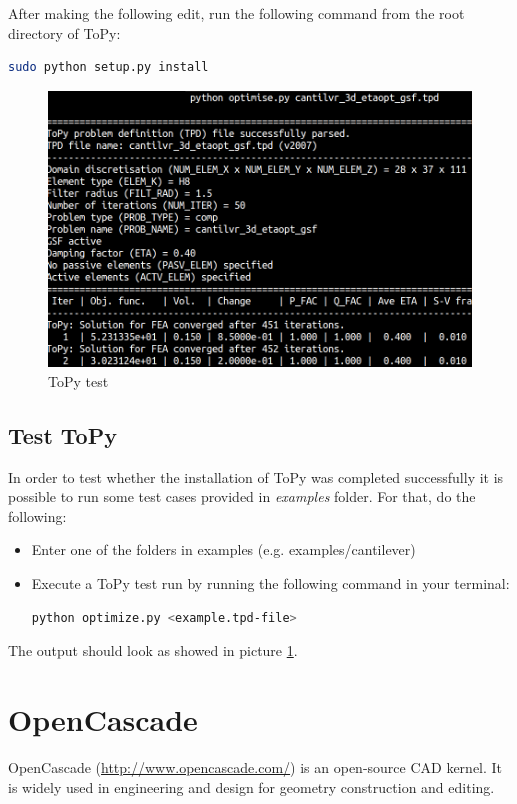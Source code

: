 \documentclass[11pt,a4paper,article,bibtotoc,idxtotoc,headsepline,footsepline,footexclude,DIV13,oneside]{scrbook}
\begin{document}
After making the following edit, run the following command from the root directory of ToPy:

\begin{lstlisting}[language=bash]
sudo python setup.py install
\end{lstlisting}	
	\begin{figure}
	\centering
	\includegraphics[scale=0.3]{img/ToPy_ExampleRun_cut.png}
	\caption{ToPy test}
	\label{fig:ToPy_test}
	\end{figure}


	\section{Test ToPy}
	In order to test whether the installation of ToPy was completed successfully it is possible to run some test cases provided in \textit{examples} folder. For that, do the following:
	\begin{itemize}
	\item Enter one of the folders in examples (e.g. examples/cantilever)
	\item Execute a ToPy test run by running the following command in your terminal:
\begin{lstlisting}[language=bash]
python optimize.py <example.tpd-file>
\end{lstlisting}	
	\end{itemize}
	
The output should look as showed in picture \ref{fig:ToPy_test}.

\chapter{OpenCascade}
\label{OpenCascade}
OpenCascade (\href{http://www.opencascade.com/}{http://www.opencascade.com/}) is an open-source CAD kernel. It is widely used in engineering and design for geometry construction and editing.
\end{document}
